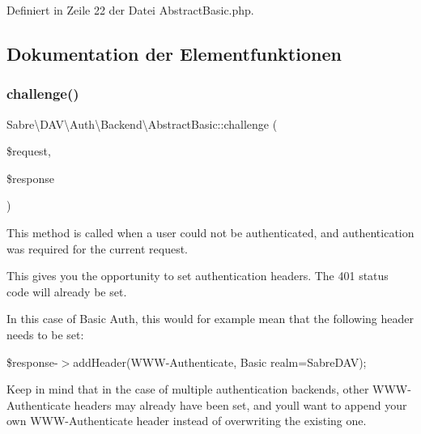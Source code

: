 Definiert in Zeile 22 der Datei Abstract\+Basic.\+php.



\subsection{Dokumentation der Elementfunktionen}
\mbox{\label{class_sabre_1_1_d_a_v_1_1_auth_1_1_backend_1_1_abstract_basic_a114ac7dc4af3f4421d38b1c295eb0e92}} 
\subsubsection{\texorpdfstring{challenge()}{challenge()}}
{\footnotesize\ttfamily Sabre\textbackslash{}\+D\+A\+V\textbackslash{}\+Auth\textbackslash{}\+Backend\textbackslash{}\+Abstract\+Basic\+::challenge (\begin{DoxyParamCaption}\item[{\mbox{\hyperlink{interface_sabre_1_1_h_t_t_p_1_1_request_interface}{Request\+Interface}}}]{\$request,  }\item[{\mbox{\hyperlink{interface_sabre_1_1_h_t_t_p_1_1_response_interface}{Response\+Interface}}}]{\$response }\end{DoxyParamCaption})}

This method is called when a user could not be authenticated, and authentication was required for the current request.

This gives you the opportunity to set authentication headers. The 401 status code will already be set.

In this case of Basic Auth, this would for example mean that the following header needs to be set\+:

\$response-\/$>$add\+Header(\textquotesingle{}W\+W\+W-\/\+Authenticate\textquotesingle{}, \textquotesingle{}Basic realm=Sabre\+D\+AV\textquotesingle{});

Keep in mind that in the case of multiple authentication backends, other W\+W\+W-\/\+Authenticate headers may already have been set, and you\textquotesingle{}ll want to append your own W\+W\+W-\/\+Authenticate header instead of overwriting the existing one.


